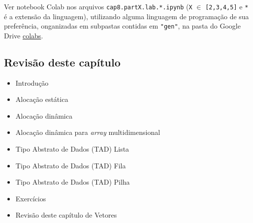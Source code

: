 \documentclass[12pt,a4paper]{article}
\providecommand{\tightlist}{%
      \setlength{\itemsep}{0pt}\setlength{\parskip}{0pt}}
\begin{document}
    Ver notebook Colab nos arquivos \texttt{cap8.partX.lab.*.ipynb}
(\texttt{X} \(\in\) \texttt{{[}2,3,4,5{]}} e \texttt{*} é a extensão da
linguagem), utilizando alguma linguagem de programação de sua
preferência, onganizadas em subpastas contidas em \texttt{"gen"}, na
pasta do Google Drive
\href{https://drive.google.com/drive/folders/1YlFwv8XYN7PYYf-HwDMlkxzbmXzJw9cM?usp=sharing}{colabs}.

    \hypertarget{revisuxe3o-deste-capuxedtulo}{%
\subsection{Revisão deste capítulo}\label{revisuxe3o-deste-capuxedtulo}}

\begin{itemize}
\tightlist
\item
  Introdução
\item
  Alocação estática
\item
  Alocação dinâmica
\item
  Alocação dinâmica para \emph{array} multidimensional
\item
  Tipo Abstrato de Dados (TAD) Lista
\item
  Tipo Abstrato de Dados (TAD) Fila
\item
  Tipo Abstrato de Dados (TAD) Pilha
\item
  Exercícios
\item
  Revisão deste capítulo de Vetores
\end{itemize}


    
    
    
\end{document}
